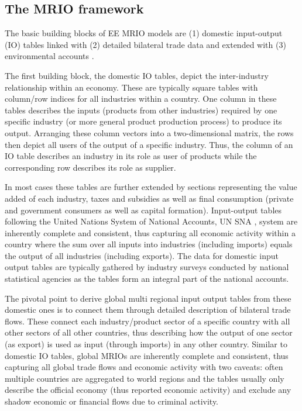 \documentclass{jors}
\begin{document}
{\subsection*{The MRIO framework}


The basic building blocks of EE MRIO models are (1) domestic input-output (IO) tables linked with (2) detailed bilateral trade data and extended with (3) environmental accounts \cite{wiedmann2011_Quo}.

The first building block, the domestic IO tables, depict the inter-industry relationship within an economy. 
These are typically square tables with column/row indices for all industries within a country.
One column in these tables describes the inputs (products from other industries) required by one specific industry (or more general product production process) to produce its output. 
Arranging these column vectors into a two-dimensional matrix, the rows then depict all users of the output of a specific industry. 
Thus, the column of an IO table describes an industry in its role as user of products while the corresponding row describes its role as supplier.

In most cases these tables are further extended by sections representing the value added of each industry, taxes and subsidies as well as final consumption (private and government consumers as well as capital formation).
Input-output tables following the United Nations System of National Accounts, UN SNA \cite{unitednations2009_System}, system are inherently complete and consistent, thus capturing all economic activity within a country where the sum over all inputs into industries (including imports) equals the output of all industries (including exports). 
The data for domestic input output tables are typically gathered by industry surveys conducted by national statistical agencies as the tables form an integral part of the national accounts. 

The pivotal point to derive global multi regional input output tables from these domestic ones is to connect them through detailed description of bilateral trade flows. 
These connect each industry/product sector of a specific country with all other sectors of all other countries, thus describing how the output of one sector (as export) is used as input (through imports) in any other country. 
Similar to domestic IO tables, global MRIOs are inherently complete and consistent, thus capturing all global trade flows and economic activity with two caveats: often multiple countries are aggregated to world regions and the tables usually only describe the official economy (thus reported economic activity) and exclude any shadow economic or financial flows due to criminal activity.

}
\end{document}

